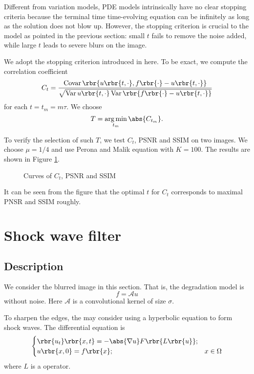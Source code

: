 \documentclass[english, nochinese]{pnote}
\DeclareMathOperator\opvar{\mathrm{Var}}
\DeclareMathOperator\opcovar{\mathrm{Covar}}
\begin{document}
Different from variation models, PDE models intrinsically have no clear stopping criteria because the terminal time time-evolving equation can be infinitely as long as the solution does not blow up. However, the stopping criterion is crucial to the model as pointed in the previous section: small $t$ fails to remove the noise added, while large $t$ leads to severe blurs on the image.

We adopt the stopping criterion introduced in \parencite{tsiotsios_choice_2013} here. To be exact, we compute the correlation coefficient
\begin{equation}
C_t = \frac{ \opcovar \rbr{ u \rbr{ t, \cdot }, f \rbr{\cdot} - u \rbr{ t, \cdot } } }{\sqrt{ \opvar u \rbr{ t, \cdot } \opvar \rbr{ f \rbr{\cdot} - u \rbr{ t, \cdot } } }}
\end{equation}
for each $ t = t_m = m \tau $. We choose
\begin{equation}
T = \mathop{\arg\min}_{t_m} \abs{C_{t_m}}.
\end{equation}

To verify the selection of such $T$, we test $C_t$, PSNR and SSIM on two images. We choose $ \mu = 1 / 4 $ and use Perona and Malik equation with $ K = 100 $. The results are shown in Figure \ref{Fig:Corr}.

\begin{figure}[htbp]
\centering
\scalebox{0.75}{}
\caption{Curves of $C_t$, PSNR and SSIM}
\label{Fig:Corr}
\end{figure}

It can be seen from the figure that the optimal $t$ for $C_t$ corresponds to maximal PNSR and SSIM roughly.

\section{Shock wave filter}

\subsection{Description}

We consider the blurred image in this section. That is, the degradation model is
\begin{equation}
f = \mathcal{A} u
\end{equation}
without noise. Here $\mathcal{A}$ is a convolutional kernel of size $\sigma$.

To sharpen the edges, the may consider using a hyperbolic equation to form shock waves. The differential equation is
\begin{equation} \label{Eq:Hyp}
\begin{cases}
\rbr{u_t} \rbr{ x, t } = -\abs{ \nabla u } F \rbr{ L \rbr{u} }; \\
u \rbr{ x, 0 } = f \rbr{x}; & x \in \Omega
\end{cases}
\end{equation}
where $L$ is a operator.
\end{document}
